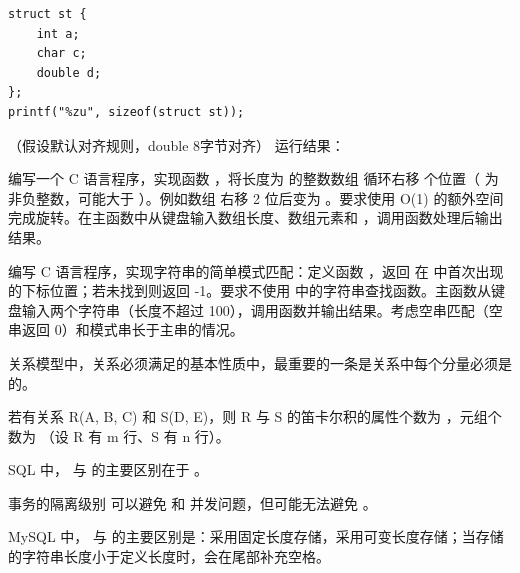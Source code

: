 \documentclass[a4paper,11pt]{article}
\begin{document}
\q
\begin{lstlisting}[language={[custom]C}]
struct st {
    int a;
    char c;
    double d;
};
printf("%zu", sizeof(struct st));
\end{lstlisting}
（假设默认对齐规则，double 8字节对齐）
运行结果：\underline{\hspace{3cm}}


\pq 编写一个 C 语言程序，实现函数 ，将长度为  的整数数组  循环右移  个位置（ 为非负整数，可能大于 ）。例如数组  右移 2 位后变为 。要求使用 O(1) 的额外空间完成旋转。在主函数中从键盘输入数组长度、数组元素和 ，调用函数处理后输出结果。

\anslines{5cm}

\pq 编写 C 语言程序，实现字符串的简单模式匹配：定义函数 ，返回  在  中首次出现的下标位置；若未找到则返回 -1。要求不使用  中的字符串查找函数。主函数从键盘输入两个字符串（长度不超过 100），调用函数并输出结果。考虑空串匹配（空串返回 0）和模式串长于主串的情况。

\anslines{5cm}



\q 关系模型中，关系必须满足的基本性质中，最重要的一条是关系中每个分量必须是 \fillblank 的。

\q 若有关系 R(A, B, C) 和 S(D, E)，则 R 与 S 的笛卡尔积的属性个数为 \fillblank ，元组个数为 \fillblank （设 R 有 m 行、S 有 n 行）。

\q SQL 中， 与  的主要区别在于 \fillblank 。

\q 事务的隔离级别  可以避免 \fillblank 和 \fillblank 并发问题，但可能无法避免 \fillblank 。

\q MySQL 中， 与  的主要区别是：\fillblank 采用固定长度存储，\fillblank 采用可变长度存储；当存储的字符串长度小于定义长度时，\fillblank 会在尾部补充空格。
\end{document}
